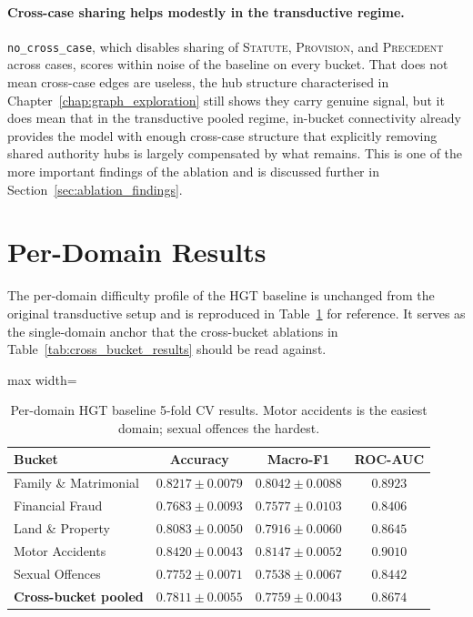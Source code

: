 \paragraph{Cross-case sharing helps modestly in the transductive
regime.} \texttt{no\_cross\_case}, which disables sharing of
\textsc{Statute}, \textsc{Provision}, and \textsc{Precedent} across
cases, scores within noise of the baseline on every bucket. That
does not mean cross-case edges are useless, the hub structure
characterised in Chapter~\ref{chap:graph_exploration} still shows
they carry genuine signal, but it does mean that in the
transductive pooled regime, in-bucket connectivity already provides
the model with enough cross-case structure that explicitly removing
shared authority hubs is largely compensated by what remains. This
is one of the more important findings of the ablation and is
discussed further in Section~\ref{sec:ablation_findings}.

\section{Per-Domain Results}

The per-domain difficulty profile of the HGT baseline is unchanged
from the original transductive setup and is reproduced in
Table~\ref{tab:per_domain} for reference. It serves as the
single-domain anchor that the cross-bucket ablations in
Table~\ref{tab:cross_bucket_results} should be read against.

\begin{table}[H]
  \centering
  \small
  \begin{adjustbox}{max width=\textwidth}
  \begin{tabular}{lccc}
    \toprule
    Bucket & Accuracy & Macro-F1 & ROC-AUC \\
    \midrule
    Family \& Matrimonial & $0.8217\pm0.0079$ & $0.8042\pm0.0088$ & $0.8923$ \\
    Financial Fraud & $0.7683\pm0.0093$ & $0.7577\pm0.0103$ & $0.8406$ \\
    Land \& Property & $0.8083\pm0.0050$ & $0.7916\pm0.0060$ & $0.8645$ \\
    Motor Accidents & $0.8420\pm0.0043$ & $0.8147\pm0.0052$ & $0.9010$ \\
    Sexual Offences & $0.7752\pm0.0071$ & $0.7538\pm0.0067$ & $0.8442$ \\
    \midrule
    \textbf{Cross-bucket pooled} & $0.7811\pm0.0055$ & $0.7759\pm0.0043$ & $0.8674$ \\
    \bottomrule
  \end{tabular}
  \end{adjustbox}
  \caption{Per-domain HGT baseline 5-fold CV results. Motor accidents
  is the easiest domain; sexual offences the hardest.}
  \label{tab:per_domain}
\end{table}

